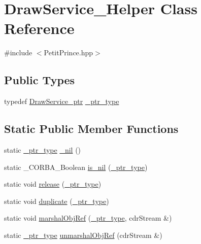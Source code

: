 \hypertarget{class_draw_service___helper}{}\section{Draw\+Service\+\_\+\+Helper Class Reference}
\label{class_draw_service___helper}


{\ttfamily \#include $<$Petit\+Prince.\+hpp$>$}

\subsection*{Public Types}
\begin{DoxyCompactItemize}
\item 
typedef \hyperlink{_petit_prince_8hpp_a65d1c7d29682996870d909fc2b3b5d82}{Draw\+Service\+\_\+ptr} \hyperlink{class_draw_service___helper_aee63c4c64cf9021c283c7f930fe6e9e1}{\+\_\+ptr\+\_\+type}
\end{DoxyCompactItemize}
\subsection*{Static Public Member Functions}
\begin{DoxyCompactItemize}
\item 
static \hyperlink{class_draw_service___helper_aee63c4c64cf9021c283c7f930fe6e9e1}{\+\_\+ptr\+\_\+type} \hyperlink{class_draw_service___helper_a2e9a05e0fde4517f37efcbf04d66554b}{\+\_\+nil} ()
\item 
static \+\_\+\+C\+O\+R\+B\+A\+\_\+\+Boolean \hyperlink{class_draw_service___helper_aca3eba83a20c9072ec6d3d5b6785079a}{is\+\_\+nil} (\hyperlink{class_draw_service___helper_aee63c4c64cf9021c283c7f930fe6e9e1}{\+\_\+ptr\+\_\+type})
\item 
static void \hyperlink{class_draw_service___helper_a9a6ebf9310423ca952f585a356910d1e}{release} (\hyperlink{class_draw_service___helper_aee63c4c64cf9021c283c7f930fe6e9e1}{\+\_\+ptr\+\_\+type})
\item 
static void \hyperlink{class_draw_service___helper_a92b45677304a0e2e2e52bf56bbb95f82}{duplicate} (\hyperlink{class_draw_service___helper_aee63c4c64cf9021c283c7f930fe6e9e1}{\+\_\+ptr\+\_\+type})
\item 
static void \hyperlink{class_draw_service___helper_ac2e466a991180061b97179fe01a9d440}{marshal\+Obj\+Ref} (\hyperlink{class_draw_service___helper_aee63c4c64cf9021c283c7f930fe6e9e1}{\+\_\+ptr\+\_\+type}, cdr\+Stream \&)
\item 
static \hyperlink{class_draw_service___helper_aee63c4c64cf9021c283c7f930fe6e9e1}{\+\_\+ptr\+\_\+type} \hyperlink{class_draw_service___helper_aa5562710ca1ef2b81b1463323f87c9b5}{unmarshal\+Obj\+Ref} (cdr\+Stream \&)
\end{DoxyCompactItemize}


